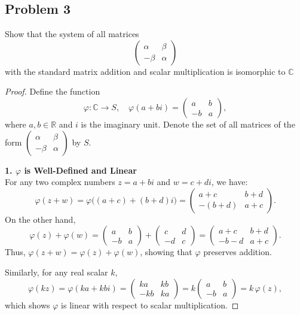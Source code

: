 \documentclass[letterpaper, 11pt]{article}
\newcommand{\1}{\mathds{1}}	%
\theoremstyle{definition}
\begin{document}
\subsection*{Problem 3}
Show that the system of all matrices$$
    \begin{pmatrix}
        \alpha & \beta \\
        -\beta & \alpha
    \end{pmatrix}
$$ with the standard matrix addition and scalar multiplication is isomorphic to $ \mathbb{C} $ 
\begin{proof}
    Define the function 
\[
\varphi\colon \mathbb{C} \to S,\quad \varphi(a+bi) = \begin{pmatrix} a & b \\ -b & a \end{pmatrix},
\]
where $a,b \in \mathbb{R}$ and $i$ is the imaginary unit. Denote the set of all matrices of the form $\begin{pmatrix} \alpha & \beta \\ -\beta & \alpha \end{pmatrix}$ by $S$.

\textbf{1. $\varphi$ is Well-Defined and Linear}\\
For any two complex numbers $z = a+bi$ and $w = c+di$, we have:
\[
\varphi(z+w) = \varphi\bigl((a+c)+(b+d)i\bigr) = \begin{pmatrix} a+c & b+d \\ -(b+d) & a+c \end{pmatrix}.
\]
On the other hand,
\[
\varphi(z) + \varphi(w) = \begin{pmatrix} a & b \\ -b & a \end{pmatrix} + \begin{pmatrix} c & d \\ -d & c \end{pmatrix} = \begin{pmatrix} a+c & b+d \\ -b-d & a+c \end{pmatrix}.
\]
Thus, $\varphi(z+w) = \varphi(z) + \varphi(w)$, showing that $\varphi$ preserves addition.

Similarly, for any real scalar $k$,
\[
\varphi(kz) = \varphi(ka+kbi) = \begin{pmatrix} ka & kb \\ -kb & ka \end{pmatrix} = k \begin{pmatrix} a & b \\ -b & a \end{pmatrix} = k\,\varphi(z),
\]
which shows $\varphi$ is linear with respect to scalar multiplication.


\end{proof}
\end{document}
